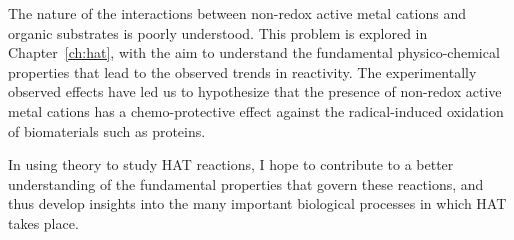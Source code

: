 \begin{doublespace}
The nature of the interactions between non-redox active metal cations and
organic substrates is poorly understood. This problem is explored in
Chapter~\ref{ch:hat}, with the aim to understand the fundamental
physico-chemical properties that lead to the observed trends in reactivity. The
experimentally observed effects have led us to hypothesize that the presence of
non-redox active metal cations has a chemo-protective effect against the
radical-induced oxidation of biomaterials such as proteins.

In using theory to study HAT reactions, I hope to contribute to a better
understanding of the fundamental properties that govern these reactions, and
thus develop insights into the many important biological processes in which HAT
takes place.

\end{doublespace}
